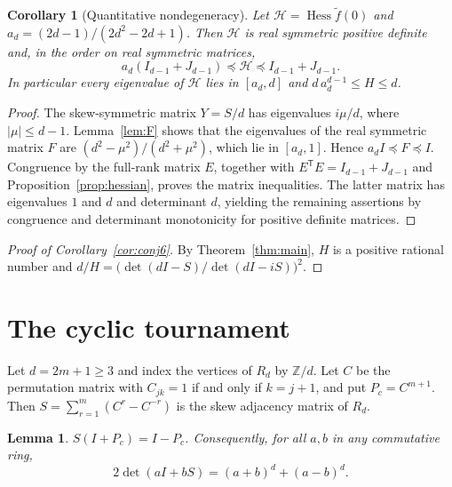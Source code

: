\documentclass[11pt]{amsart}
\newtheorem{lemma}[theorem]{Lemma}
\newtheorem{corollary}[theorem]{Corollary}
\theoremstyle{remark}
\numberwithin{equation}{section}
\newcommand{\T}{\mathsf{T}}
\newcommand{\Hess}{\operatorname{Hess}}
\begin{document}
\begin{corollary}[Quantitative nondegeneracy]\label{cor:positivehessian}
Let $\mathcal H=\Hess\tilde f(0)$ and $a_d=(2d-1)/(2d^2-2d+1)$. Then $\mathcal H$ is real symmetric positive definite and, in the order on real symmetric matrices,
\[
a_d(I_{d-1}+J_{d-1})\preceq\mathcal H\preceq I_{d-1}+J_{d-1}.
\]
In particular every eigenvalue of $\mathcal H$ lies in $[a_d,d]$ and $d\,a_d^{d-1}\le H\le d$.
\end{corollary}

\begin{proof}
The skew-symmetric matrix $Y=S/d$ has eigenvalues $i\mu/d$, where $|\mu|\le d-1$. Lemma~\ref{lem:F} shows that the eigenvalues of the real symmetric matrix $F$ are $(d^2-\mu^2)/(d^2+\mu^2)$, which lie in $[a_d,1]$. Hence $a_d I\preceq F\preceq I$. Congruence by the full-rank matrix $E$, together with $E^\T E=I_{d-1}+J_{d-1}$ and Proposition~\ref{prop:hessian}, proves the matrix inequalities. The latter matrix has eigenvalues $1$ and $d$ and determinant $d$, yielding the remaining assertions by congruence and determinant monotonicity for positive definite matrices.
\end{proof}

\begin{proof}[Proof of Corollary~\ref{cor:conj6}]
By Theorem~\ref{thm:main}, $H$ is a positive rational number and $d/H=\bigl(\det(dI-S)/\det(dI-iS)\bigr)^2$.
\end{proof}

\section{The cyclic tournament}\label{sec:cyclic}

Let $d=2m+1\ge3$ and index the vertices of $R_d$ by $\mathbb Z/d$. Let $C$ be the permutation matrix with $C_{jk}=1$ if and only if $k=j+1$, and put $P_c=C^{m+1}$. Then $S=\sum_{r=1}^m(C^r-C^{-r})$ is the skew adjacency matrix of $R_d$.

\begin{lemma}\label{lem:cayley}
$S(I+P_c)=I-P_c$. Consequently, for all $a,b$ in any commutative ring,
\begin{equation}\label{eq:aIbS}
2\det(aI+bS)=(a+b)^d+(a-b)^d.
\end{equation}
\end{lemma}
\end{document}
